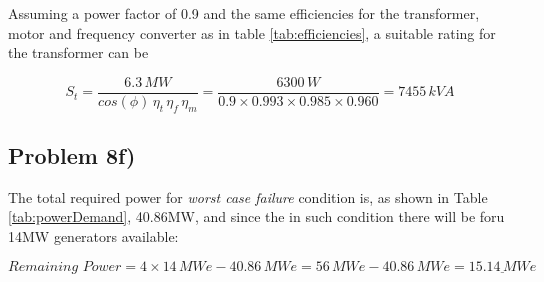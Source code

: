 Assuming a power factor of 0.9 and the same efficiencies for the transformer, motor and frequency converter as in table \ref{tab:efficiencies}, a suitable rating for the transformer can be


\[
S_{t}=\frac{6.3\,MW}{cos(\phi)\,\eta_t\,\eta_f\,\eta_m}=\frac{6300\,W}{0.9 \times 0.993 \times 0.985 \times 0.960}=7455 \, kV\!A
\]


\subsection{Problem 8f)}


The total required power for \textit{worst case failure} condition is, as shown in Table \ref{tab:powerDemand}, 40.86MW, and since the in such condition there will be foru 14MW generators available: 

\[
Remaining\,\,Power=4 \times 14\,MWe - 40.86\,MWe = 56\,MWe - 40.86\,MWe = \underline{15.14 \, MWe}
\]
